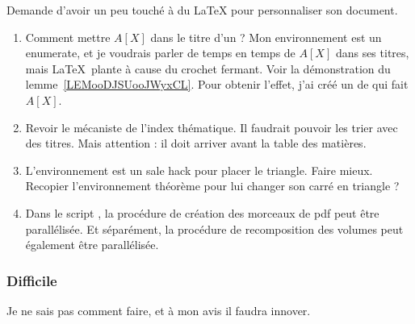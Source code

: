 Demande d'avoir un peu touché à du \LaTeX{} pour personnaliser son document.

\begin{enumerate}
    \item
        Comment mettre \( A[X]\) dans le titre d'un  ? Mon environnement  est un enumerate, et je voudrais parler de temps en temps de \( A[X]\) dans ses titres, mais \LaTeX\ plante à cause du crochet fermant. Voir la démonstration du lemme~\ref{LEMooDJSUooJWyxCL}. Pour obtenir l'effet, j'ai créé un  de  qui fait \( A[X]\).
    \item
        Revoir le mécaniste de l'index thématique. Il faudrait pouvoir les trier avec des titres. Mais attention : il doit arriver avant la table des matières.
    \item
        L'environnement  est un sale hack pour placer le triangle. Faire mieux. Recopier l'environnement théorème pour lui changer son carré en triangle ?
    \item
        Dans le script , la procédure de création des morceaux de pdf peut être parallélisée. Et séparément, la procédure de recomposition des volumes peut également être parallélisée.
\end{enumerate}

\subsubsection{Difficile}

Je ne sais pas comment faire, et à mon avis il faudra innover.

